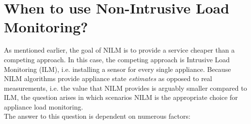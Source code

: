 \documentclass[11pt]{cmuthesis} %
\begin{document}
\iffalse
\section{When to use Non-Intrusive Load Monitoring?}

As mentioned earlier, the goal of NILM is to provide a service cheaper than a competing approach. In this case, the competing approach is Intrusive Load Monitoring (ILM), i.e. installing a sensor for every single appliance. Because NILM algorithms provide appliance state \emph{estimates} as opposed to real measurements, i.e. the value that NILM provides is arguably smaller compared to ILM, the question arises in which scenarios NILM is the appropriate choice for appliance load monitoring.\\
The answer to this question is dependent on numerous factors:
\end{document}
